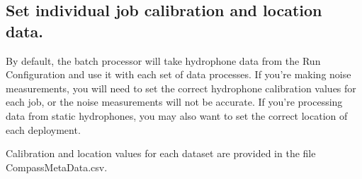 \documentclass[
]{article}
\begin{document}
\subsection{Set individual job calibration and location
data.}\label{set-individual-job-calibration-and-location-data.}

By default, the batch processor will take hydrophone data from the Run
Configuration and use it with each set of data processes. If you're
making noise measurements, you will need to set the correct hydrophone
calibration values for each job, or the noise measurements will not be
accurate. If you're processing data from static hydrophones, you may
also want to set the correct location of each deployment.

Calibration and location values for each dataset are provided in the
file CompassMetaData.csv.
\end{document}
